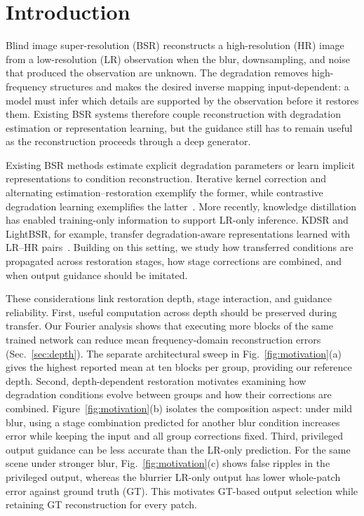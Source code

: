 \documentclass[10pt,journal,letterpaper]{IEEEtran}
\begin{document}
\section{Introduction}
\label{sec:intro}

Blind image super-resolution (BSR) reconstructs a high-resolution (HR) image from a low-resolution (LR) observation when the blur, downsampling, and noise that produced the observation are unknown. The degradation removes high-frequency structures and makes the desired inverse mapping input-dependent: a model must infer which details are supported by the observation before it restores them. Existing BSR systems therefore couple reconstruction with degradation estimation or representation learning, but the guidance still has to remain useful as the reconstruction proceeds through a deep generator.

Existing BSR methods estimate explicit degradation parameters or learn implicit representations to condition reconstruction. Iterative kernel correction and alternating estimation--restoration exemplify the former, while contrastive degradation learning exemplifies the latter~\cite{gu2019ikc,luo2020dan,wang2021dasr}. More recently, knowledge distillation has enabled training-only information to support LR-only inference. KDSR and LightBSR, for example, transfer degradation-aware representations learned with LR--HR pairs~\cite{xia2023kdsr,yuan2025lightbsr}. Building on this setting, we study how transferred conditions are propagated across restoration stages, how stage corrections are combined, and when output guidance should be imitated.

These considerations link restoration depth, stage interaction, and guidance reliability. First, useful computation across depth should be preserved during transfer. Our Fourier analysis shows that executing more blocks of the same trained network can reduce mean frequency-domain reconstruction errors (Sec.~\ref{sec:depth}). The separate architectural sweep in Fig.~\ref{fig:motivation}(a) gives the highest reported mean at ten blocks per group, providing our reference depth. Second, depth-dependent restoration motivates examining how degradation conditions evolve between groups and how their corrections are combined. Figure~\ref{fig:motivation}(b) isolates the composition aspect: under mild blur, using a stage combination predicted for another blur condition increases error while keeping the input and all group corrections fixed. Third, privileged output guidance can be less accurate than the LR-only prediction. For the same scene under stronger blur, Fig.~\ref{fig:motivation}(c) shows false ripples in the privileged output, whereas the blurrier LR-only output has lower whole-patch error against ground truth (GT). This motivates GT-based output selection while retaining GT reconstruction for every patch.
\end{document}
